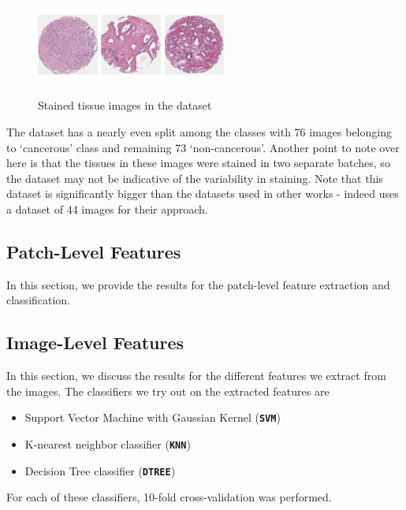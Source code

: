 \begin{figure}
\includegraphics[width=2.0cm]{figs/41_red.pdf}
\includegraphics[width=2.0cm]{figs/108_green.pdf}
\includegraphics[width=2.0cm]{figs/109_red.pdf}
\caption{Stained tissue images in the dataset}
\label{fig:TissueImageExample}

\end{figure}  
  

The dataset has a nearly even split among the classes with 76 images belonging to `cancerous' class and remaining 73 `non-cancerous'. Another point to note over here is that the tissues in these images were stained in two separate batches, so the dataset may not be indicative of the variability in staining. Note that this dataset is significantly bigger than the datasets used in other works - indeed \cite{naik2007gland} uses a dataset of 44 images for their approach.

\subsection{Patch-Level Features}
In this section, we provide the results for the patch-level feature extraction and classification.

\subsection{Image-Level Features}
In this section, we discuss the results for the different features we extract from the images. The classifiers we try out on the extracted features are 
\begin{itemize}
\item Support Vector Machine with Gaussian Kernel (\textbf{\texttt{SVM}})
\item K-nearest neighbor classifier (\textbf{\texttt{KNN}})
\item Decision Tree classifier (\textbf{\texttt{DTREE}})
\end{itemize}
For each of these classifiers, 10-fold cross-validation was performed. 


